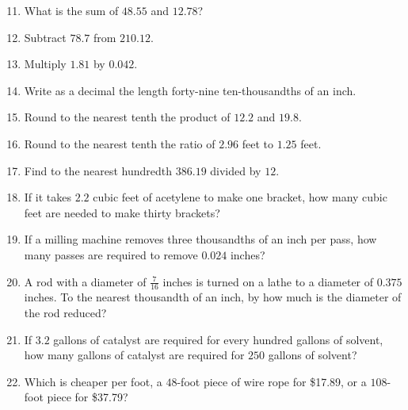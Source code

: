 \documentclass[12pt]{article}
\begin{document}
\begin{enumerate}
\setcounter{enumi}{10}
		\newcommand{\spacing}{\vspace{0.60in}}
\item What is the sum of $48.55$ and $12.78$? 
\spacing

\item Subtract $78.7$ from $210.12$.
\spacing

\item Multiply $1.81$ by $0.042$. 
\spacing

\item Write as a decimal the length forty-nine ten-thousandths of an inch. 
\spacing

\item Round to the nearest tenth the product of $12.2$ and $19.8$. 
\spacing

\item Round to the nearest tenth the ratio of $2.96$ feet to $1.25$ feet.  
\spacing

\item Find to the nearest hundredth $386.19$ divided by $12$.  
\spacing

\item If it takes $2.2$ cubic feet of acetylene to make one bracket, how many cubic feet are needed to make thirty brackets? 
\spacing

\item If a milling machine removes three thousandths of an inch per pass, how many passes are required to remove $0.024$ inches?
\spacing

\item A rod with a diameter of $\frac{7}{16}$ inches is turned on a lathe to a diameter of $0.375$ inches. To the nearest thousandth of an inch, by how much is the diameter of the rod reduced?
\spacing

\item If $3.2$ gallons of catalyst are required for every hundred gallons of solvent, how many gallons of catalyst are required for $250$ gallons of solvent? 
\spacing

\item Which is cheaper per foot, a $48$-foot piece of wire rope for \$17.89, or a $108$-foot piece for \$37.79? 

\end{enumerate}
\end{document}

